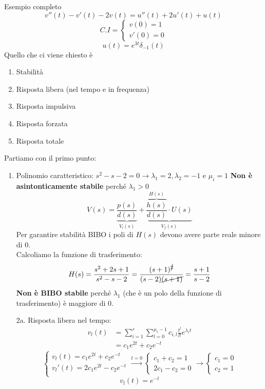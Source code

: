 \documentclass[a4paper]{article}
\begin{document}
\begin{examplebox}{Esempio completo}
    \[v''(t) - v'(t) - 2v(t) = u''(t) + 2u'(t) + u(t)\]
    \[C.I = \begin{cases}
        v(0) = 1\\
        v'(0) = 0
    \end{cases}\]
    \[u(t) = e^{3t}\delta_{-1}(t)\]
    Quello che ci viene chiesto è \begin{enumerate}
        \item Stabilità
        \item Risposta libera (nel tempo e in frequenza)
        \item Risposta impulsiva
        \item Risposta forzata
        \item Risposta totale
    \end{enumerate}
    Partiamo con il primo punto:
    \begin{enumerate}
        \item Polinomio caratteristico: $s^2 - s - 2 = 0 \rightarrow \lambda_1 = 2, \lambda_2 = -1$ e $\mu_i = 1$
        \textbf{Non è asintonticamente stabile} perché $\lambda_1 > 0$ 
        \[V(s) = \underbrace{\frac{p(s)}{d(s)}}_{V_l(s)} + \underbrace{\overbrace{\frac{h(s)}{d(s)}}^{H(s)} \cdot U(s)}_{V_f(s)}\]
        Per garantire stabilità BIBO i poli di $H(s)$ devono avere parte reale minore di 0.\\
        Calcoliamo la funzione di trasferimento:
        \[H(s) = \frac{s^2 + 2s + 1}{s^2 - s - 2} = \frac{(s+1)^{\cancel{2}}}{(s-2)\cancel{(s+1)}} = \frac{s+1}{s-2}\]
        \textbf{Non è BIBO stabile} perché $\lambda_1$ (che è un polo della funzione di trasferimento) è maggiore di 0.
        \item[2a. ] Risposta libera nel tempo:
        \begin{align*}
            v_l(t) &= \sum_{i = 1}^{r} \sum_{l = 0}^{\mu_i - 1} c_{i,l}\frac{t^l}{l!}e^{\lambda_it}\\
            &= c_{1}e^{2t} + c_{2}e^{-t}
        \end{align*}
        \[\begin{cases}
            v_l(t) = c_{1}e^{2t} + c_{2}e^{-t}\\
            v_l'(t) = 2c_{1}e^{2t} - c_{2}e^{-t}\\
        \end{cases} \stackrel{t = 0}{\rightarrow} \begin{cases}
            c_1 + c_2 = 1\\
            2c_1 - c_2 = 0
        \end{cases} \rightarrow \begin{cases}
            c_1 = 0\\
            c_2 = 1
        \end{cases}\]
        \[v_l(t) = e^{-t}\]
        

\end{enumerate}
\end{examplebox}
\end{document}
